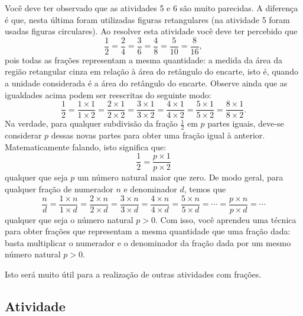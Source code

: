 \begin{refletindo*}[breakable]{}{}  
  Você deve ter observado que as atividades 5 e 6 são muito parecidas.   
  A diferença é que, nesta última foram utilizadas figuras retangulares (na atividade 5 foram usadas figuras circulares).   
  Ao resolver esta atividade você deve ter percebido que   
  $$\dfrac{1}{2}=\dfrac{2}{4}=\dfrac{3}{6}=\dfrac{4}{8}=\dfrac{5}{10}=\dfrac{8}{16},$$
  pois todas as frações representam a mesma quantidade: a medida da área da região retangular cinza em relação à área do retângulo do encarte, isto é, quando a unidade considerada é a área do retângulo do encarte.  
  Observe ainda que as igualdades acima podem ser reescritas do seguinte modo:  
  $$\dfrac{1}{2}=\dfrac{1 \times 1}{1 \times 2}= \dfrac{2 \times 1}{2 \times 2} =\dfrac{3 \times 1}{3 \times 2} = \dfrac{4 \times 1}{4 \times 2} = \dfrac{5 \times 1}{5 \times 2}= \dfrac{8 \times 1}{8 \times 2}.$$
  Na verdade, para qualquer subdivisão da fração   $\frac{1}{2}$ em   $p$ partes iguais, deve-se considerar   $p$ dessas novas partes para obter uma fração igual à anterior. Matematicamente falando, isto significa que:  
  $$\dfrac{1}{2}= \dfrac{p \times 1}{p \times 2}$$ 
  qualquer que seja   $p$ um número natural maior que zero.  
  De modo geral, para qualquer fração    de numerador $n$ e denominador $d$,  temos que  
  $$\dfrac{n}{d}=\dfrac{1 \times n}{1 \times d}= \dfrac{2 \times n}{2 \times d} = \dfrac{3 \times n}{3 \times d} = \dfrac{4 \times n}{4 \times d} = \dfrac{5 \times n}{5 \times d}=\cdots =  \dfrac{p \times n}{p \times d}= \cdots$$
  qualquer que seja o número natural   $p > 0$.  
  Com isso, você aprendeu uma técnica para obter frações que representam a mesma quantidade que uma fração dada: basta multiplicar o numerador e o denominador da fração dada por um mesmo número natural   $p > 0$.   
  
  Isto será muito útil para a realização de outras atividades com frações.  
\end{refletindo*}



\subsection{Atividade}


